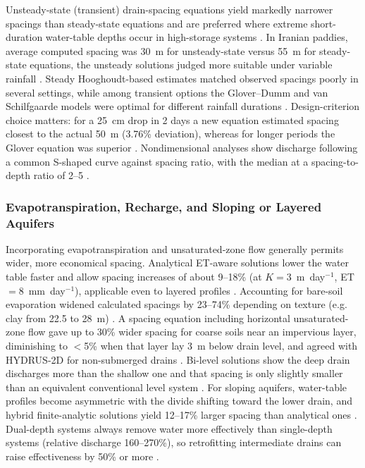 \documentclass[11pt]{article}
\begin{document}
Unsteady-state (transient) drain-spacing equations yield markedly narrower spacings than steady-state equations and are preferred where extreme short-duration water-table depths occur in high-storage systems \parencite{OOSTERBAAN1988}. In Iranian paddies, average computed spacing was 30~m for unsteady-state versus 55~m for steady-state equations, the unsteady solutions judged more suitable under variable rainfall \parencite{DarziNaftchally2014}. Steady Hooghoudt-based estimates matched observed spacings poorly in several settings, while among transient options the Glover--Dumm and van Schilfgaarde models were optimal for different rainfall durations \parencite{Moshayedi2020}. Design-criterion choice matters: for a 25~cm drop in 2 days a new equation estimated spacing closest to the actual 50~m (3.76\% deviation), whereas for longer periods the Glover equation was superior \parencite{Pali2014}. Nondimensional analyses show discharge following a common S-shaped curve against spacing ratio, with the median at a spacing-to-depth ratio of 2--5 \parencite{Nédélec2010}.

\subsubsection{Evapotranspiration, Recharge, and Sloping or Layered Aquifers}

Incorporating evapotranspiration and unsaturated-zone flow generally permits wider, more economical spacing. Analytical ET-aware solutions lower the water table faster and allow spacing increases of about 9--18\% (at $K=3$~m~day$^{-1}$, ET $=8$~mm~day$^{-1}$), applicable even to layered profiles \parencite{NIKAM1992,Singh2010,Upadhyaya2000}. Accounting for bare-soil evaporation widened calculated spacings by 23--74\% depending on texture (e.g. clay from 22.5 to 28~m) \parencite{AbdelFattah2005}. A spacing equation including horizontal unsaturated-zone flow gave up to 30\% wider spacing for coarse soils near an impervious layer, diminishing to $<$5\% when that layer lay 3~m below drain level, and agreed with HYDRUS-2D for non-submerged drains \parencite{Yousfi2014}. Bi-level solutions show the deep drain discharges more than the shallow one and that spacing is only slightly smaller than an equivalent conventional level system \parencite{Verma1998,Upadhyaya2000,Kankarej2023}. For sloping aquifers, water-table profiles become asymmetric with the divide shifting toward the lower drain, and hybrid finite-analytic solutions yield 12--17\% larger spacing than analytical ones \parencite{Singh2010,Upadhyaya2013,Hartani2001}. Dual-depth systems always remove water more effectively than single-depth systems (relative discharge 160--270\%), so retrofitting intermediate drains can raise effectiveness by 50\% or more \parencite{Kirkham1997}.
\end{document}

